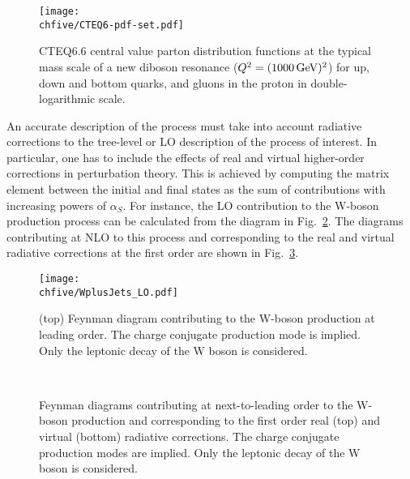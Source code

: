 \begin{figure}[!htb]
\centering
\texttt{[image: \\chfive/CTEQ6-pdf-set.pdf]}
\caption{CTEQ6.6 central value parton distribution functions at the typical mass scale of a new diboson resonance ($Q^2 = (1000\,\text{Ge\hspace{-.08em}V})^2$) for up, down and bottom quarks, and gluons in the proton in double-logarithmic scale.}
\label{fig:pdfs}
\end{figure}

An accurate description of the process must take into account radiative corrections to the tree-level or LO description of the process of interest.
In particular, one has to include the effects of real and virtual higher-order corrections in perturbation theory.
This is achieved by computing the matrix element between the initial and final states as the sum of contributions with increasing powers of $\alpha_S$.
For instance, the LO contribution to the W-boson production process can be calculated from the diagram in Fig.~\ref{fig:wjetsFD_LO}.
The diagrams contributing at NLO to this process and corresponding to the real and virtual radiative corrections at the first order are shown in Fig.~\ref{fig:wjetsFD_NLO}.\\

\begin{figure}[!htb]
\centering
\texttt{[image: \\chfive/WplusJets\_LO.pdf]}
\caption{(top) Feynman diagram contributing to the W-boson production at leading order. The charge conjugate production mode is implied. Only the leptonic decay of the W boson is considered.}
\label{fig:wjetsFD_LO}
\end{figure}

\begin{figure}[!htb]
\centering
{}
\\
\caption{Feynman diagrams contributing at next-to-leading order to the W-boson production and corresponding to the first order real (top) and virtual (bottom) radiative corrections.
The charge conjugate production modes are implied. Only the leptonic decay of the W boson is considered.}
\label{fig:wjetsFD_NLO}
\end{figure}

